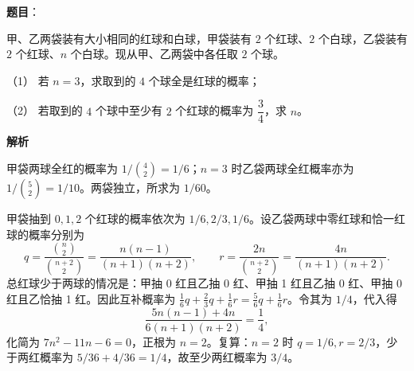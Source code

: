 \begin{answer}

\textbf{题目}：

甲、乙两袋装有大小相同的红球和白球，甲袋装有 $2$ 个红球、$2$ 个白球，乙袋装有 $2$ 个红球、$n$ 个白球。现从甲、乙两袋中各任取 $2$ 个球。

（1） 若 $n=3$，求取到的 $4$ 个球全是红球的概率；

（2） 若取到的 $4$ 个球中至少有 $2$ 个红球的概率为 $\dfrac34$，求 $n$。

\textbf{解析}


甲袋两球全红的概率为 $1/\binom42=1/6$；$n=3$ 时乙袋两球全红概率亦为 $1/\binom52=1/10$。两袋独立，所求为 $1/60$。


甲袋抽到 $0,1,2$ 个红球的概率依次为 $1/6,2/3,1/6$。设乙袋两球中零红球和恰一红球的概率分别为
\nopagebreak[4]
\[
q=\frac{\binom n2}{\binom{n+2}2}=\frac{n(n-1)}{(n+1)(n+2)},\qquad
r=\frac{2n}{\binom{n+2}2}=\frac{4n}{(n+1)(n+2)}.
\]
总红球少于两球的情况是：甲抽 0 红且乙抽 0 红、甲抽 1 红且乙抽 0 红、甲抽 0 红且乙恰抽 1 红。因此互补概率为 $\frac16q+\frac23q+\frac16r=\frac56q+\frac16r$。令其为 $1/4$，代入得
\nopagebreak[4]
\[
\frac{5n(n-1)+4n}{6(n+1)(n+2)}=\frac14,
\]
化简为 $7n^2-11n-6=0$，正根为 $n=2$。复算：$n=2$ 时 $q=1/6,r=2/3$，少于两红概率为 $5/36+4/36=1/4$，故至少两红概率为 $3/4$。



\end{answer}
